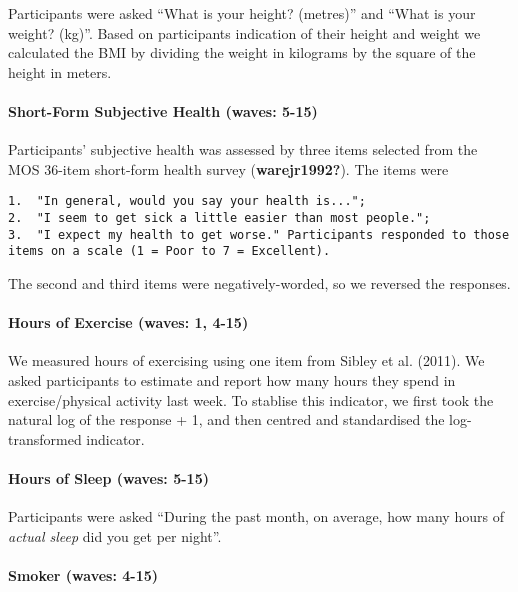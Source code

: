 \documentclass[
  letterpaper,
  DIV=11,
  numbers=noendperiod]{scrartcl}
\let\oldparagraph\paragraph
\renewcommand{\paragraph}[1]{\oldparagraph{#1}\mbox{}}
\begin{document}
Participants were asked ``What is your height? (metres)'' and ``What is
your weight? (kg)''. Based on participants indication of their height
and weight we calculated the BMI by dividing the weight in kilograms by
the square of the height in meters.

\hypertarget{short-form-subjective-health-waves-5-15}{%
\paragraph{Short-Form Subjective Health (waves:
5-15)}\label{short-form-subjective-health-waves-5-15}}

Participants' subjective health was assessed by three items selected
from the MOS 36-item short-form health survey (\textbf{warejr1992?}).
The items were

\begin{verbatim}
1.  "In general, would you say your health is...";
2.  "I seem to get sick a little easier than most people.";
3.  "I expect my health to get worse." Participants responded to those items on a scale (1 = Poor to 7 = Excellent).
\end{verbatim}

The second and third items were negatively-worded, so we reversed the
responses.

\hypertarget{hours-of-exercise-waves-1-4-15}{%
\paragraph{Hours of Exercise (waves: 1,
4-15)}\label{hours-of-exercise-waves-1-4-15}}

We measured hours of exercising using one item from Sibley et al.
(2011). We asked participants to estimate and report how many hours they
spend in exercise/physical activity last week. To stablise this
indicator, we first took the natural log of the response + 1, and then
centred and standardised the log-transformed indicator.

\hypertarget{hours-of-sleep-waves-5-15}{%
\paragraph{Hours of Sleep (waves:
5-15)}\label{hours-of-sleep-waves-5-15}}

Participants were asked ``During the past month, on average, how many
hours of \emph{actual sleep} did you get per night''.

\hypertarget{smoker-waves-4-15}{%
\paragraph{Smoker (waves: 4-15)}\label{smoker-waves-4-15}}
\end{document}
